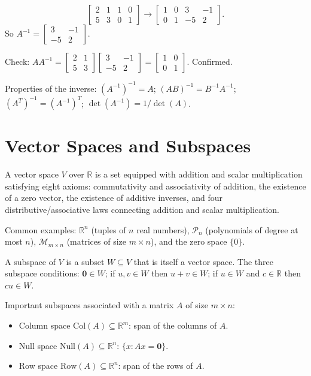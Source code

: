 \documentclass[11pt]{article}
\begin{document}
\[
\begin{bmatrix} 2 & 1 & 1 & 0 \\ 5 & 3 & 0 & 1 \end{bmatrix}
\to
\begin{bmatrix} 1 & 0 & 3 & -1 \\ 0 & 1 & -5 & 2 \end{bmatrix}.
\]
So $A^{-1} = \begin{bmatrix} 3 & -1 \\ -5 & 2 \end{bmatrix}$.

Check: $AA^{-1} = \begin{bmatrix} 2 & 1 \\ 5 & 3 \end{bmatrix}\begin{bmatrix} 3 & -1 \\ -5 & 2 \end{bmatrix} = \begin{bmatrix} 1 & 0 \\ 0 & 1 \end{bmatrix}$. Confirmed.

Properties of the inverse: $(A^{-1})^{-1} = A$; $(AB)^{-1} = B^{-1}A^{-1}$; $(A^T)^{-1} = (A^{-1})^T$; $\det(A^{-1}) = 1/\det(A)$.

\section*{Vector Spaces and Subspaces}

A vector space $V$ over $\mathbb{R}$ is a set equipped with addition and scalar multiplication satisfying eight axioms: commutativity and associativity of addition, the existence of a zero vector, the existence of additive inverses, and four distributive/associative laws connecting addition and scalar multiplication.

Common examples: $\mathbb{R}^n$ (tuples of $n$ real numbers), $\mathcal{P}_n$ (polynomials of degree at most $n$), $\mathcal{M}_{m \times n}$ (matrices of size $m \times n$), and the zero space $\{0\}$.

A subspace of $V$ is a subset $W \subseteq V$ that is itself a vector space. The three subspace conditions: $\mathbf{0} \in W$; if $u, v \in W$ then $u + v \in W$; if $u \in W$ and $c \in \mathbb{R}$ then $cu \in W$.

Important subspaces associated with a matrix $A$ of size $m \times n$:
\begin{itemize}
  \item Column space $\text{Col}(A) \subseteq \mathbb{R}^m$: span of the columns of $A$.
  \item Null space $\text{Null}(A) \subseteq \mathbb{R}^n$: $\{x : Ax = \mathbf{0}\}$.
  \item Row space $\text{Row}(A) \subseteq \mathbb{R}^n$: span of the rows of $A$.
\end{itemize}
\end{document}
